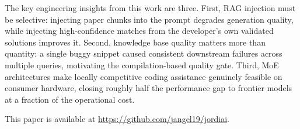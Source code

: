 \documentclass[11pt,twocolumn]{article}
\begin{document}
The key engineering insights from this work are three. First, RAG injection
must be selective: injecting paper chunks into the prompt degrades generation
quality, while injecting high-confidence matches from the developer's own
validated solutions improves it. Second, knowledge base quality matters more
than quantity: a single buggy snippet caused consistent downstream failures
across multiple queries, motivating the compilation-based quality gate. Third,
MoE architectures make locally competitive coding assistance genuinely
feasible on consumer hardware, closing roughly half the performance gap to
frontier models at a fraction of the operational cost.

This paper is available at \url{https://github.com/jangel19/jordiai}.
\end{document}
